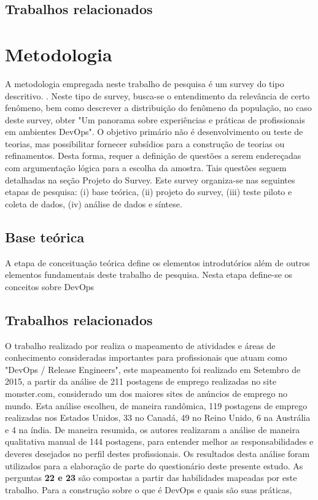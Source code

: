 \documentclass[twoside,english,brazilian]{UNISINOSartigo}
\begin{document}
\subsection{Trabalhos relacionados}

\section{Metodologia}
A metodologia empregada neste trabalho de pesquisa é um survey do tipo descritivo. \cite{Miguel}. Neste tipo de survey, busca-se o entendimento da relevância de certo fenômeno, bem como descrever a distribuição do fenômeno da população, no caso deste survey, obter "Um panorama sobre experiências e práticas de profissionais em ambientes DevOps". O objetivo primário não é desenvolvimento ou
teste de teorias, mas possibilitar fornecer subsídios para a construção de teorias ou refinamentos. Desta forma, requer a definição de questões a serem endereçadas com argumentação lógica para a escolha da amostra. Tais questões seguem detalhadas na seção Projeto do Survey.
Este survey organiza-se nas seguintes etapas de pesquisa: (i) base teórica, (ii) projeto do survey, (iii) teste piloto e coleta de dados, (iv) análise de dados e síntese.

\subsection{Base teórica}
A etapa de conceituação teórica define os elementos introdutórios além de outros elementos fundamentais deste trabalho de pesquisa. Nesta etapa define-se os conceitos sobre DevOps


\subsection{Trabalhos relacionados}
O trabalho realizado por  realiza o mapeamento de atividades e áreas de conhecimento consideradas importantes para profissionais que atuam como "DevOps / Release Engineers", este mapeamento foi realizado em Setembro de 2015, a partir da análise de 211 postagens de emprego realizadas no site monster.com, considerado um dos maiores sites de anúncios de emprego no mundo. Esta análise escolheu, de maneira randômica, 119 postagens de emprego realizadas nos Estados Unidos, 33 no Canadá, 49 no Reino Unido, 6 na Austrália e 4 na índia.  De maneira resumida, os autores realizaram a análise de maneira qualitativa manual de 144 postagens, para entender melhor as responsabilidades e deveres desejados no perfil destes profissionais. Os resultados desta análise foram utilizados para a elaboração de parte do questionário deste presente estudo. As perguntas \textbf{22 e 23} são compostas a partir das habilidades mapeadas por este trabalho.
Para a construção sobre o que é DevOps e quais são suas práticas, 
\end{document}
